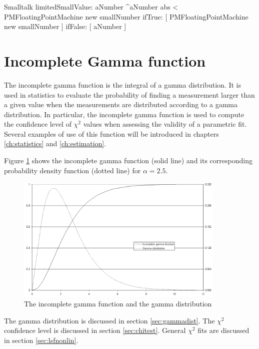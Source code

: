 \begin{displaycode}{Smalltalk}
limitedSmallValue: aNumber
    ^aNumber abs < PMFloatingPointMachine new smallNumber
            ifTrue: [ PMFloatingPointMachine new smallNumber ]
            ifFalse: [ aNumber ]
\end{displaycode}

\section{Incomplete Gamma function}
\label{sec:incGamma} The incomplete gamma function is the integral
of a gamma distribution. It is used in statistics to evaluate the
probability of finding a measurement larger than a given value
when the measurements are distributed according to a gamma
distribution. In particular, the incomplete gamma function is used
to compute the confidence level of $\chi^2$ values when assessing
the validity of a parametric fit. Several examples of use of this
function will be introduced in chapters \ref{ch:statistics} and
\ref{ch:estimation}.

Figure \ref{fig:incGamma} shows the incomplete gamma function
(solid line) and its corresponding probability density function
(dotted line) for $\alpha=2.5$.
\begin{figure}
\centering\includegraphics[width=10cm]{Figures/IncompleteGammaFunction}
\caption{The incomplete gamma function and the gamma distribution}\label{fig:incGamma}
\end{figure}

The gamma distribution is discussed in section \ref{sec:gammadist}. The $\chi^2$ confidence level is discussed in section \ref{sec:chitest}. General $\chi^2$ fits are discussed in
section \ref{sec:lsfnonlin}.

